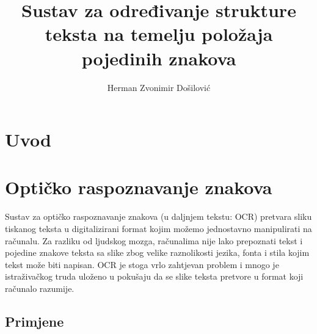 \documentclass[times, utf8, zavrsni]{fer}
\begin{document}

\title{Sustav za određivanje strukture teksta na temelju položaja pojedinih znakova}

\author{Herman Zvonimir Došilović}

\maketitle





\tableofcontents

\chapter{Uvod}
\chapter{Optičko raspoznavanje znakova}
Sustav za optičko raspoznavanje znakova  (u daljnjem tekstu: OCR)
pretvara sliku tiskanog teksta u digitalizirani format kojim možemo jednostavno manipulirati na računalu.
Za razliku od ljudskog mozga, računalima nije lako prepoznati tekst i pojedine znakove teksta sa slike
zbog velike raznolikosti jezika, fonta i stila kojim tekst može biti napisan.
OCR je stoga vrlo zahtjevan problem i mnogo je istraživačkog truda uloženo u pokušaju
da se slike teksta pretvore u format koji računalo razumije. \citep{DBLP:journals/corr/abs-1710-05703}

\section{Primjene}
\end{document}
